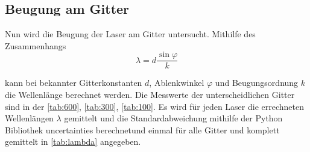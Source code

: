 \subsection{Beugung am Gitter}
Nun wird die Beugung der Laser am Gitter untersucht. Mithilfe des Zusammenhangs
\begin{equation}
    \lambda = d \frac{\sin \varphi}{k}
\end{equation}

kann bei bekannter Gitterkonstanten $d$, Ablenkwinkel $\varphi$ und Beugungsordnung $k$ die Wellenlänge berechnet werden. Die Messwerte der unterscheidlichen Gitter sind in der 
\autoref{tab:600}, \autoref{tab:300}, \autoref{tab:100}. Es wird für jeden Laser die errechneten Wellenlängen $\lambda$ gemittelt und die Standardabweichung mithilfe der Python
Bibliothek uncertainties berechnetund einmal für alle Gitter und komplett gemittelt in \autoref{tab:lambda} angegeben.

